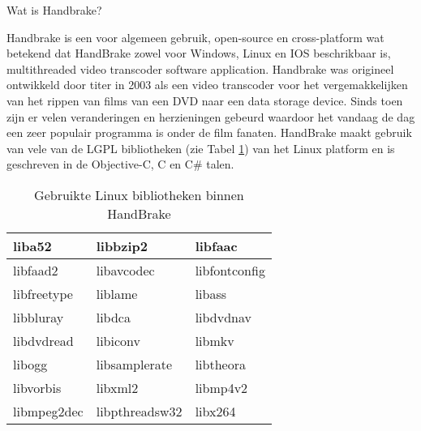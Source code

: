 \label{Hoofdstuk 1}

\begin{sectionbox}{Wat is Handbrake?}\end{sectionbox}

Handbrake is een voor algemeen gebruik, open-source en cross-platform wat betekend dat HandBrake zowel voor Windows, Linux en IOS beschrikbaar is, multithreaded video transcoder software application.
Handbrake was origineel ontwikkeld door titer in 2003 als een video transcoder voor het vergemakkelijken van het rippen van films van een DVD naar een data storage device. Sinds toen zijn er velen veranderingen en herzieningen gebeurd waardoor het vandaag de dag een zeer populair programma is onder de film fanaten. HandBrake maakt gebruik van vele van de LGPL bibliotheken (zie Tabel \ref{tab:linuxbibtable}) van het Linux platform en is geschreven in de Objective-C, C en C\# talen.\\

\begin{table}[!h]
\centering
\begin{tabular}{ | l | l | l | }
\hline
liba52 & libbzip2 & libfaac \\ \hline
libfaad2 & libavcodec & libfontconfig \\ \hline
libfreetype & liblame & libass \\ \hline
libbluray & libdca & libdvdnav \\ \hline
libdvdread & libiconv  & libmkv \\ \hline
libogg & libsamplerate & libtheora \\ \hline
libvorbis & libxml2  & libmp4v2 \\ \hline
libmpeg2dec & libpthreadsw32 & libx264 \\ 
\hline
\end{tabular}
\caption{Gebruikte Linux bibliotheken binnen HandBrake}
\label{tab:linuxbibtable}
\end{table}
\ \\